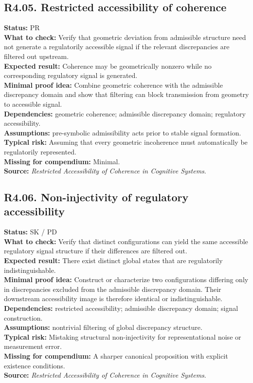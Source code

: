 \documentclass[12pt]{article}
\begin{document}
	\subsection*{R4.05. Restricted accessibility of coherence}
	\textbf{Status:} PR \\
	\textbf{What to check:} Verify that geometric deviation from admissible structure need not generate a regulatorily accessible signal if the relevant discrepancies are filtered out upstream. \\
	\textbf{Expected result:} Coherence may be geometrically nonzero while no corresponding regulatory signal is generated. \\
	\textbf{Minimal proof idea:} Combine geometric coherence with the admissible discrepancy domain and show that filtering can block transmission from geometry to accessible signal. \\
	\textbf{Dependencies:} geometric coherence; admissible discrepancy domain; regulatory accessibility. \\
	\textbf{Assumptions:} pre-symbolic admissibility acts prior to stable signal formation. \\
	\textbf{Typical risk:} Assuming that every geometric incoherence must automatically be regulatorily represented. \\
	\textbf{Missing for compendium:} Minimal. \\
	\textbf{Source:} \emph{Restricted Accessibility of Coherence in Cognitive Systems}.
	
	\subsection*{R4.06. Non-injectivity of regulatory accessibility}
	\textbf{Status:} SK / PD \\
	\textbf{What to check:} Verify that distinct configurations can yield the same accessible regulatory signal structure if their differences are filtered out. \\
	\textbf{Expected result:} There exist distinct global states that are regulatorily indistinguishable. \\
	\textbf{Minimal proof idea:} Construct or characterize two configurations differing only in discrepancies excluded from the admissible discrepancy domain. Their downstream accessibility image is therefore identical or indistinguishable. \\
	\textbf{Dependencies:} restricted accessibility; admissible discrepancy domain; signal construction. \\
	\textbf{Assumptions:} nontrivial filtering of global discrepancy structure. \\
	\textbf{Typical risk:} Mistaking structural non-injectivity for representational noise or measurement error. \\
	\textbf{Missing for compendium:} A sharper canonical proposition with explicit existence conditions. \\
	\textbf{Source:} \emph{Restricted Accessibility of Coherence in Cognitive Systems}.
	
\end{document}
